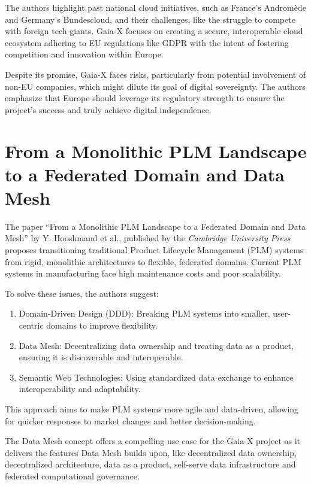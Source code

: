 The authors highlight past national cloud initiatives, such as France’s Andromède and Germany’s Bundescloud, and their challenges, like the struggle to compete with foreign tech giants.
Gaia-X focuses on creating a secure, interoperable cloud ecosystem adhering to EU regulations like GDPR with the intent of fostering competition and innovation within Europe.

Despite its promise, Gaia-X faces risks, particularly from potential involvement of non-EU companies, which might dilute its goal of digital sovereignty.
The authors emphasize that Europe should leverage its regulatory strength to ensure the project's success and truly achieve digital independence.

\section{From a Monolithic PLM Landscape to a Federated Domain and Data Mesh}\label{sec:from-a-monolithic-plm-landscape-to-a-federated-domain-and-data-mesh}

The paper ``From a Monolithic PLM Landscape to a Federated Domain and Data Mesh'' by Y. Hooshmand et al., published by the \textit{Cambridge University Press} proposes transitioning traditional Product Lifecycle Management (PLM) systems from rigid, monolithic architectures to flexible, federated domains\cite{from_monolithic_plm_to_federated}.
Current PLM systems in manufacturing face high maintenance costs and poor scalability.

To solve these issues, the authors suggest:

\begin{enumerate}
\item Domain-Driven Design (DDD): Breaking PLM systems into smaller, user-centric domains to improve flexibility.
\item Data Mesh: Decentralizing data ownership and treating data as a product, ensuring it is discoverable and interoperable.
\item Semantic Web Technologies: Using standardized data exchange to enhance interoperability and adaptability.
\end{enumerate}
This approach aims to make PLM systems more agile and data-driven, allowing for quicker responses to market changes and better decision-making.

The Data Mesh concept offers a compelling use case for the Gaia-X project as it delivers the features Data Mesh builds upon, like decentralized data ownership, decentralized architecture, data as a product, self-serve data infrastructure and federated computational governance.

